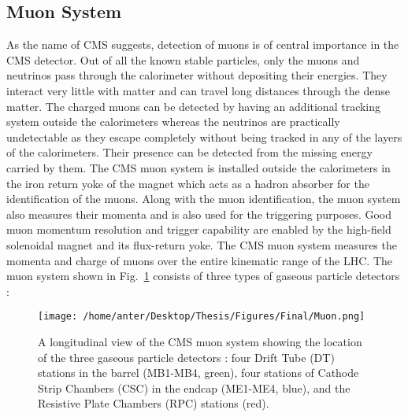 \subsection{Muon System}
As the name of CMS suggests, detection of muons is of central importance in the CMS detector. Out of all the known stable particles, only the muons and neutrinos pass through the calorimeter without depositing their energies. They interact very little with matter and can travel long distances through the dense matter. The charged muons can be detected by having an additional tracking system outside the calorimeters whereas the neutrinos are practically undetectable as they escape completely without being tracked in any of the layers of the calorimeters. Their presence can be detected from the missing energy carried by them. The CMS muon system is installed outside the calorimeters in the iron return yoke of the magnet which acts as a hadron absorber for the identification of the muons. Along with the muon identification, the muon system also measures their momenta and is also used for the triggering purposes. Good muon momentum resolution and trigger capability are enabled by the high-field solenoidal magnet and its flux-return yoke. The CMS muon system measures the momenta and charge of muons over the entire kinematic range of the LHC. The muon system shown in Fig.~\ref{fig:muon} consists of three types of gaseous particle detectors : \\ \newline
\begin{figure}[!t]
\begin{center}
\vspace*{3mm} 
\hspace*{-5mm}
\texttt{[image: /home/anter/Desktop/Thesis/Figures/Final/Muon.png]}\\
\vspace*{4mm}
\caption[A longitudinal view of the CMS muon system showing the location of the three gaseous particle detectors.]{A longitudinal view of the CMS muon system showing the location of the three gaseous particle detectors : four Drift Tube (DT) stations in the barrel (MB1-MB4, green), four stations of Cathode Strip Chambers (CSC) in the endcap (ME1-ME4, blue), and the Resistive Plate Chambers (RPC) stations (red)\footnotemark.}
\label{fig:muon}
\end{center}
\end{figure}
